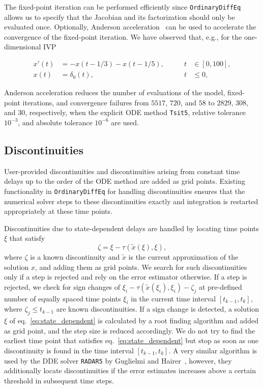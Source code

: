 \documentclass{juliacon}
\def\pkg#1{\texttt{#1}}
\def\alg#1{\texttt{#1}}
\begin{document}
The fixed-point iteration can be performed efficiently since \pkg{OrdinaryDiffEq}
allows us to specify that the Jacobian and its factorization should only
be evaluated once.
Optionally, Anderson acceleration~\cite{anderson65_iterative_procedures,walker11_anderson_acceleration_fixed_point} can be used to accelerate the convergence of the fixed-point iteration.
We have observed that, e.g., for the one-dimensional IVP

\begin{equation*}
    \begin{aligned}
        x'(t) &= - x(t - 1/3) - x(t - 1/5), \qquad & t &\in [0, 100],\\
        x(t) &= \delta_{0}(t), \qquad &t &\leq 0,
    \end{aligned}
\end{equation*}

Anderson acceleration reduces the number of evaluations of the model,
fixed-point iterations, and convergence failures from $5517$, $720$, and $58$
to $2829$, $308$, and $30$, respectively, when the explicit ODE
method \alg{Tsit5}, relative tolerance $10^{-3}$, and absolute tolerance $10^{-6}$
are used.

\subsection{Discontinuities}

User-provided discontinuities and discontinuities arising from constant time delays
up to the order of the ODE method are added as grid points. Existing functionality
in \pkg{OrdinaryDiffEq} for handling discontinuities ensures that the numerical solver
steps to these discontinuities exactly and integration is restarted appropriately
at these time points.

Discontinuities due to state-dependent delays are handled by locating time points $\xi$
that satisfy
\begin{equation}\label{eq:state_dependent}
    \zeta = \xi - \tau(\tilde{x}(\xi), \xi),
\end{equation}
where $\zeta$ is a known discontinuity and $\tilde{x}$ is the current approximation of
the solution $x$, and adding them as grid points. We search for such discontinuities 
only if a step is rejected and rely on the error estimator otherwise. If a step
is rejected, we check for sign changes of $\xi_i - \tau(\tilde{x}(\xi_i), \xi_i) - \zeta_j$
at pre-defined number of equally spaced time points $\xi_i$ in the current time
interval $[t_{k - 1}, t_k]$, where $\zeta_j \leq t_{k - 1}$ are known discontinuities.
If a sign change is detected, a solution $\xi$ of eq.~\eqref{eq:state_dependent} is
calculated by a root finding algorithm and added as grid point, and the step size is
reduced accordingly. We do not try to find the earliest time point that satisfies
eq.~\eqref{eq:state_dependent} but stop as soon as one discontinuity is found in the
time interval $[t_{k - 1}, t_k]$. A very similar algorithm is used by
the DDE solver \pkg{RADAR5} by Guglielmi and Hairer~\cite{guglielmi01_implementing_radau},
however, they additionally locate discontinuities if the error estimates increases
above a certain threshold in subsequent time steps.
\end{document}
